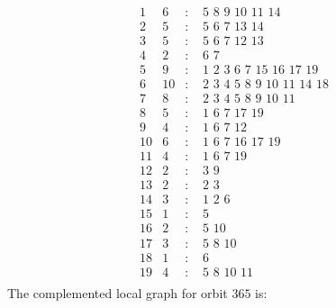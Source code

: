 \documentclass[12pt]{article}
\begin{document}
\begin{equation*}
\begin{array}{rrcl}
1&6&:&\,\,5\,\,8\,\,9\,\,10\,\,11\,\,14\\
2&5&:&\,\,5\,\,6\,\,7\,\,13\,\,14\\
3&5&:&\,\,5\,\,6\,\,7\,\,12\,\,13\\
4&2&:&\,\,6\,\,7\\
5&9&:&\,\,1\,\,2\,\,3\,\,6\,\,7\,\,15\,\,16\,\,17\,\,19\\
6&10&:&\,\,2\,\,3\,\,4\,\,5\,\,8\,\,9\,\,10\,\,11\,\,14\,\,18\\
7&8&:&\,\,2\,\,3\,\,4\,\,5\,\,8\,\,9\,\,10\,\,11\\
8&5&:&\,\,1\,\,6\,\,7\,\,17\,\,19\\
9&4&:&\,\,1\,\,6\,\,7\,\,12\\
10&6&:&\,\,1\,\,6\,\,7\,\,16\,\,17\,\,19\\
11&4&:&\,\,1\,\,6\,\,7\,\,19\\
12&2&:&\,\,3\,\,9\\
13&2&:&\,\,2\,\,3\\
14&3&:&\,\,1\,\,2\,\,6\\
15&1&:&\,\,5\\
16&2&:&\,\,5\,\,10\\
17&3&:&\,\,5\,\,8\,\,10\\
18&1&:&\,\,6\\
19&4&:&\,\,5\,\,8\,\,10\,\,11\\
\end{array}
\end{equation*}
The complemented local graph for orbit $365$ is:
\end{document}
